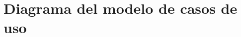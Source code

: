 {}
\appendix
\renewcommand{\appendixname}{Anexos}
\renewcommand{\appendixtocname}{Anexos}
\renewcommand{\appendixpagename}{Anexos}
\clearpage
\addappheadtotoc



    \begin{minipage}{0.95\textwidth}
    \chapter{Diagrama del modelo de casos de uso}
	    \label{DiagCU}
	\end{minipage}


